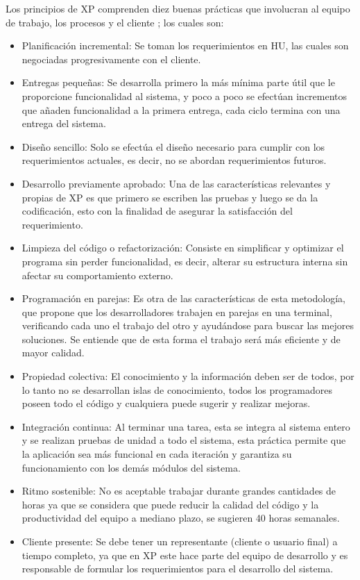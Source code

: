 Los principios de \ac{XP} comprenden diez buenas prácticas que involucran al equipo de trabajo, los procesos y el cliente \citep{pressman2014se}; los cuales son:
\begin{itemize}
	\item Planificación incremental: Se toman los requerimientos en \ac{HU}, las cuales son negociadas progresivamente con el cliente.
	\item Entregas pequeñas: Se desarrolla primero la más mínima parte útil que le proporcione funcionalidad al sistema, y poco a poco se efectúan incrementos que añaden funcionalidad a la primera entrega, cada ciclo termina con una entrega del sistema.
	\item Diseño sencillo: Solo se efectúa el diseño necesario para cumplir con los requerimientos actuales, es decir, no se abordan requerimientos futuros.
	\item Desarrollo previamente aprobado: Una de las características relevantes y propias de \ac{XP} es que primero se escriben las pruebas y luego se da la codificación, esto con la finalidad de asegurar la satisfacción del requerimiento.
	\item Limpieza del código o refactorización: Consiste en simplificar y optimizar el programa sin perder funcionalidad, es decir, alterar su estructura interna sin afectar su comportamiento externo.
	\item Programación en parejas: Es otra de las características de esta metodología, que propone que los desarrolladores trabajen en parejas en una terminal, verificando cada uno el trabajo del otro y ayudándose para buscar las mejores soluciones. Se entiende que de esta forma el trabajo será más eficiente y de mayor calidad.
	\item Propiedad colectiva: El conocimiento y la información deben ser de todos, por lo tanto no se desarrollan islas de conocimiento, todos los programadores poseen todo el código y cualquiera puede sugerir y realizar mejoras.
	\item Integración continua: Al terminar una tarea, esta se integra al sistema entero y se realizan pruebas de unidad a todo el sistema, esta práctica permite que la aplicación sea más funcional en cada iteración y garantiza su funcionamiento con los demás módulos del sistema.
	\item Ritmo sostenible: No es aceptable trabajar durante grandes cantidades de horas ya que se considera que puede reducir la calidad del código y la productividad del equipo a mediano plazo, se sugieren 40 horas semanales.
	\item Cliente presente: Se debe tener un representante (cliente o usuario final) a tiempo completo, ya que en \ac{XP} este hace parte del equipo de desarrollo y es responsable de formular los requerimientos para el desarrollo del sistema.
\end{itemize}
    
